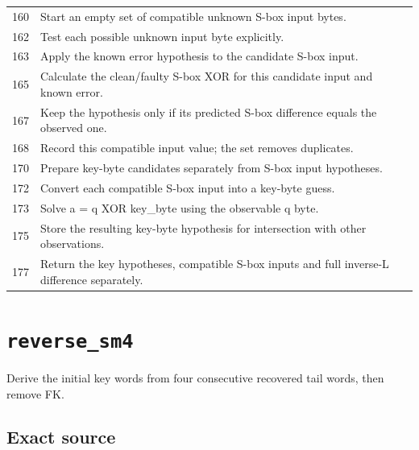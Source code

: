\begin{longtable}{r >{\raggedright\arraybackslash}p{138mm}}
160&Start an empty set of compatible unknown S-box input bytes.\\
162&Test each possible unknown input byte explicitly.\\
163&Apply the known error hypothesis to the candidate S-box input.\\
165&Calculate the clean/faulty S-box XOR for this candidate input and known error.\\
167&Keep the hypothesis only if its predicted S-box difference equals the observed one.\\
168&Record this compatible input value; the set removes duplicates.\\
170&Prepare key-byte candidates separately from S-box input hypotheses.\\
172&Convert each compatible S-box input into a key-byte guess.\\
173&Solve a = q XOR key\_byte using the observable q byte.\\
175&Store the resulting key-byte hypothesis for intersection with other observations.\\
177&Return the key hypotheses, compatible S-box inputs and full inverse-L difference separately.\\
\bottomrule\end{longtable}\endgroup
\section{\texttt{reverse\_sm4}}
Derive the initial key words from four consecutive recovered tail words, then remove FK.
\begin{center}\end{center}
\subsection*{Exact source}
